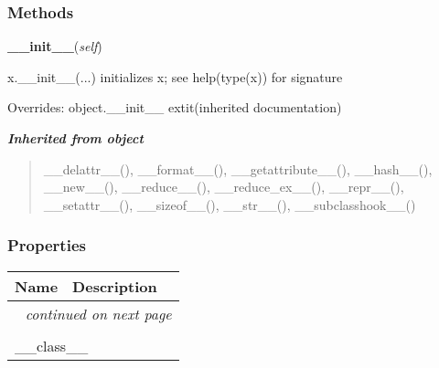   \subsubsection{Methods}

    \vspace{0.5ex}

\hspace{.8\funcindent}\begin{boxedminipage}{\funcwidth}

    \raggedright \textbf{\_\_init\_\_}(\textit{self})

\setlength{\parskip}{2ex}
    x.\_\_init\_\_(...) initializes x; see help(type(x)) for signature

\setlength{\parskip}{1ex}
      Overrides: object.\_\_init\_\_ 	extit{(inherited documentation)}

    \end{boxedminipage}


\large{\textbf{\textit{Inherited from object}}}

\begin{quote}
\_\_delattr\_\_(), \_\_format\_\_(), \_\_getattribute\_\_(), \_\_hash\_\_(), \_\_new\_\_(), \_\_reduce\_\_(), \_\_reduce\_ex\_\_(), \_\_repr\_\_(), \_\_setattr\_\_(), \_\_sizeof\_\_(), \_\_str\_\_(), \_\_subclasshook\_\_()
\end{quote}


  \subsubsection{Properties}

    \vspace{-1cm}
\hspace{\varindent}\begin{longtable}{|p{\varnamewidth}|p{\vardescrwidth}|l}
\cline{1-2}
\cline{1-2} \centering \textbf{Name} & \centering \textbf{Description}& \\
\cline{1-2}
\endhead\cline{1-2}\multicolumn{3}{r}{\small\textit{continued on next page}}\\\endfoot\cline{1-2}
\endlastfoot\multicolumn{2}{|l|}{\textit{Inherited from object}}\\
\multicolumn{2}{|p{\varwidth}|}{\raggedright \_\_class\_\_}\\
\cline{1-2}
\end{longtable}

